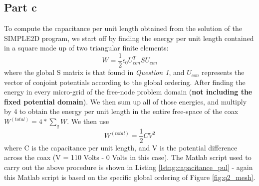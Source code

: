 \documentclass[11pt]{amsart}
\begin{document}
\subsection*{Part c}
To compute the capacitance per unit length obtained from the solution of the SIMPLE2D program, we start off by finding the energy per unit length contained in a square made up of two triangular finite elements:
$$ W = \frac{1}{2} \epsilon_{0} U^{T}_{con} S U_{con} $$
where the global S matrix is that found in \textit{Question 1}, and $U_{con}$ represents the vector of conjoint potentials according to the global ordering. After finding the energy in every micro-grid of the free-node problem domain (\textbf{not including the fixed potential domain}). We then sum up all of those energies, and multiply by 4 to obtain the energy per unit length in the entire free-space of the coax $ W^{(total)} = 4 * \sum_{q} W$. We then use
$$ W^{(total)} = \frac{1}{2} CV^2 $$
where C is the capacitance per unit length, and V is the potential difference across the coax (V = 110 Volts - 0 Volts in this case). The Matlab script used to carry out the above procedure is shown in Listing \ref{lstng:capacitance_pul} - again this Matlab script is based on the specific global ordering of Figure \ref{fig:q2_mesh}.


\pagebreak
\end{document}
